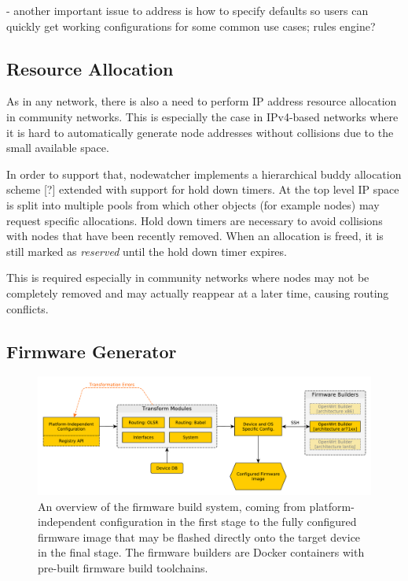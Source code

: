 \documentclass[5p,sort&compress]{elsarticle}
\begin{document}
- another important issue to address is how to specify defaults so users can quickly get working configurations for some common use cases; rules engine?

\subsection{Resource Allocation}

As in any network, there is also a need to perform IP address resource allocation in community networks.
This is especially the case in IPv4-based networks where it is hard to automatically generate node addresses without collisions due to the small available space.

In order to support that, nodewatcher implements a hierarchical buddy allocation scheme [?] extended with support for hold down timers.
At the top level IP space is split into multiple pools from which other objects (for example nodes) may request specific allocations.
Hold down timers are necessary to avoid collisions with nodes that have been recently removed.
When an allocation is freed, it is still marked as \textit{reserved} until the hold down timer expires.

This is required especially in community networks where nodes may not be completely removed and may actually reappear at a later time, causing routing conflicts.

\subsection{Firmware Generator}
\label{sec:firmware-generator}

\begin{figure}
  \centering
  \includegraphics[scale=0.5]{figures/firmware-buildsystem.pdf}
  \caption{An overview of the firmware build system, coming from platform-independent configuration in the first stage to the fully configured firmware image that may be flashed directly onto the target device in the final stage.
The firmware builders are Docker containers with pre-built firmware build toolchains.}
  \label{fig:firmware-build-system}
\end{figure}
\end{document}
